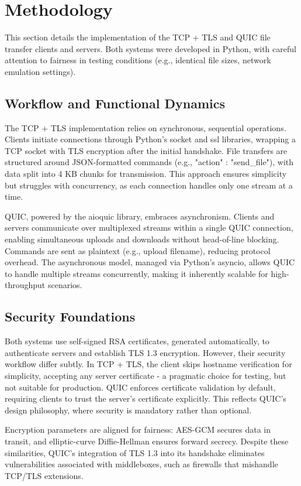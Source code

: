 \section{Methodology}
This section details the implementation of the TCP + TLS and QUIC file transfer clients and servers. Both systems were developed in Python, with careful attention to fairness in testing conditions (e.g., identical file sizes, network emulation settings).

\subsection{Workflow and Functional Dynamics}
The TCP + TLS implementation relies on synchronous, sequential operations. Clients initiate connections through Python's socket and ssl libraries, wrapping a TCP socket with TLS encryption after the initial handshake. File transfers are structured around JSON-formatted commands (e.g., {"action" : "send\_file"}), with data split into 4 KB chunks for transmission. This approach ensures simplicity but struggles with concurrency, as each connection handles only one stream at a time.

QUIC, powered by the aioquic library, embraces asynchronism. Clients and servers communicate over multiplexed streams within a single QUIC connection, enabling simultaneous uploads and downloads without head-of-line blocking. Commands are sent as plaintext (e.g., upload filename), reducing protocol overhead. The asynchronous model, managed via Python's asyncio, allows QUIC to handle multiple streams concurrently, making it inherently scalable for high-throughput scenarios.

\subsection{Security Foundations}
Both systems use self-signed RSA certificates, generated automatically, to authenticate servers and establish TLS 1.3 encryption. However, their security workflow differ subtly. In TCP + TLS, the client skips hostname verification for simplicity, accepting any server certificate - a pragmatic choice for testing, but not suitable for production. QUIC enforces certificate validation by default, requiring clients to trust the server's certificate explicitly. This reflects QUIC's design philosophy, where security is mandatory rather than optional.

Encryption parameters are aligned for fairness: AES-GCM secures data in transit, and elliptic-curve Diffie-Hellman ensures forward secrecy. Despite these similarities, QUIC's integration of TLS 1.3 into its handshake eliminates vulnerabilities associated with middleboxes, such as firewalls that mishandle TCP/TLS extensions.